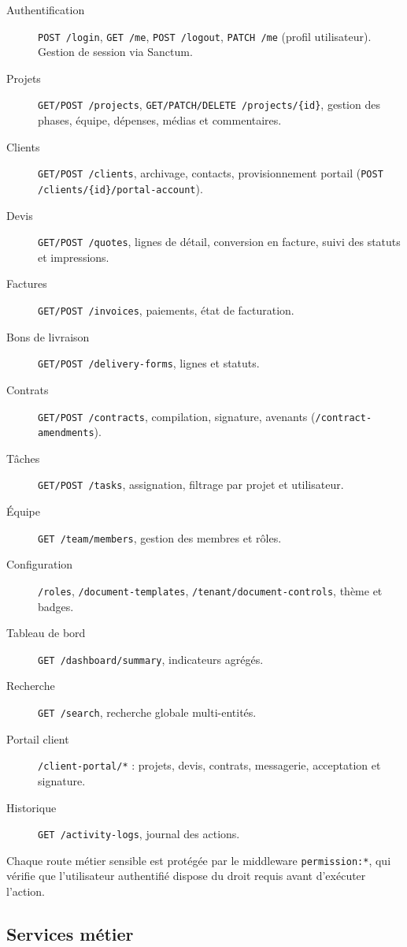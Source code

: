 \begin{description}
  \item[Authentification] \texttt{POST /login}, \texttt{GET /me}, \texttt{POST /logout},
  \texttt{PATCH /me} (profil utilisateur). Gestion de session via Sanctum.
  \item[Projets] \texttt{GET/POST /projects}, \texttt{GET/PATCH/DELETE /projects/\{id\}},
  gestion des phases, équipe, dépenses, médias et commentaires.
  \item[Clients] \texttt{GET/POST /clients}, archivage, contacts, provisionnement
  portail (\texttt{POST /clients/\{id\}/portal-account}).
  \item[Devis] \texttt{GET/POST /quotes}, lignes de détail, conversion en facture,
  suivi des statuts et impressions.
  \item[Factures] \texttt{GET/POST /invoices}, paiements, état de facturation.
  \item[Bons de livraison] \texttt{GET/POST /delivery-forms}, lignes et statuts.
  \item[Contrats] \texttt{GET/POST /contracts}, compilation, signature, avenants
  (\texttt{/contract-amendments}).
  \item[Tâches] \texttt{GET/POST /tasks}, assignation, filtrage par projet et utilisateur.
  \item[Équipe] \texttt{GET /team/members}, gestion des membres et rôles.
  \item[Configuration] \texttt{/roles}, \texttt{/document-templates},
  \texttt{/tenant/document-controls}, thème et badges.
  \item[Tableau de bord] \texttt{GET /dashboard/summary}, indicateurs agrégés.
  \item[Recherche] \texttt{GET /search}, recherche globale multi-entités.
  \item[Portail client] \texttt{/client-portal/*} : projets, devis, contrats,
  messagerie, acceptation et signature.
  \item[Historique] \texttt{GET /activity-logs}, journal des actions.
\end{description}

Chaque route métier sensible est protégée par le middleware \texttt{permission:*},
qui vérifie que l'utilisateur authentifié dispose du droit requis avant d'exécuter
l'action.

\subsection{Services métier}

